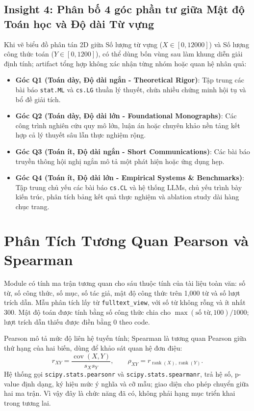 \subsection{Insight 4: Phân bố 4 góc phần tư giữa Mật độ Toán học và Độ dài Từ vựng}
Khi vẽ biểu đồ phân tán 2D giữa Số lượng từ vựng ($X \in [0, 12000]$) và Số lượng công thức toán ($Y \in [0, 1200]$), có thể dùng bốn vùng sau làm khung diễn giải định tính; artifact tổng hợp không xác nhận từng nhóm hoặc quan hệ nhân quả:
\begin{itemize}
  \item \textbf{Góc Q1 (Toán dày, Độ dài ngắn - Theoretical Rigor)}: Tập trung các bài báo \texttt{stat.ML} và \texttt{cs.LG} thuần lý thuyết, chứa nhiều chứng minh hội tụ và bổ đề giải tích.
  \item \textbf{Góc Q2 (Toán dày, Độ dài lớn - Foundational Monographs)}: Các công trình nghiên cứu quy mô lớn, luận án hoặc chuyên khảo nền tảng kết hợp cả lý thuyết sâu lẫn thực nghiệm rộng.
  \item \textbf{Góc Q3 (Toán ít, Độ dài ngắn - Short Communications)}: Các bài báo truyền thông hội nghị ngắn mô tả một phát hiện hoặc ứng dụng hẹp.
  \item \textbf{Góc Q4 (Toán ít, Độ dài lớn - Empirical Systems \& Benchmarks)}: Tập trung chủ yếu các bài báo \texttt{cs.CL} và hệ thống LLMs, chủ yếu trình bày kiến trúc, phân tích bảng kết quả thực nghiệm và ablation study dài hàng chục trang.
\end{itemize}


\section{Phân Tích Tương Quan Pearson và Spearman}
\label{sec:correlations}
Module  có tính ma trận tương quan cho sáu thuộc tính của tài liệu toàn văn: số từ, số công thức, số mục, số tác giả, mật độ công thức trên 1,000 từ và số lượt trích dẫn. Mẫu phân tích lấy từ \texttt{fulltext\_view}, với số từ không rỗng và ít nhất 300. Mật độ toán được tính bằng số công thức chia cho $\max(\text{số từ},100)/1000$; lượt trích dẫn thiếu được điền bằng 0 theo code.

Pearson mô tả mức độ liên hệ tuyến tính; Spearman là tương quan Pearson giữa thứ hạng của hai biến, dùng để khảo sát quan hệ đơn điệu:
\begin{equation}
 r_{XY}=\frac{\operatorname{cov}(X,Y)}{s_Xs_Y},
 \qquad \rho_{XY}=r_{\operatorname{rank}(X),\operatorname{rank}(Y)}.
\end{equation}
Hệ thống gọi \texttt{scipy.stats.pearsonr} và \texttt{scipy.stats.spearmanr}, trả hệ số, p-value định dạng, ký hiệu mức ý nghĩa và cỡ mẫu; giao diện cho phép chuyển giữa hai ma trận. Vì vậy đây là chức năng đã có, không phải hạng mục triển khai trong tương lai.

